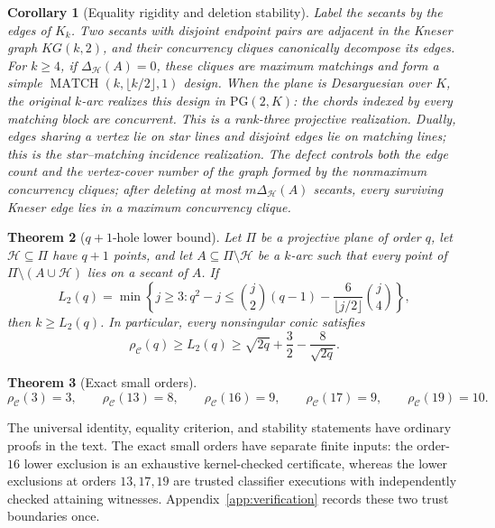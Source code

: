 \documentclass[11pt]{article}
\newtheorem{theorem}{Theorem}[section]
\newtheorem{corollary}[theorem]{Corollary}
\theoremstyle{definition}
\theoremstyle{remark}
\newcommand{\PG}{\mathrm{PG}}
\newcommand{\cC}{\mathcal{C}}
\newcommand{\cH}{\mathcal{H}}
\newcommand{\rhoC}{\rho_{\cC}}
\begin{document}
\begin{corollary}[Equality rigidity and deletion stability]
\label{cor:intro-rigidity}
Label the secants by the edges of \(K_k\).  Two secants with disjoint
endpoint pairs are adjacent in the Kneser graph \(KG(k,2)\), and their
concurrency cliques canonically decompose its edges.  For \(k\ge4\), if
\(\Delta_{\cH}(A)=0\), these cliques are maximum matchings and form a
simple \(\operatorname{MATCH}(k,\lfloor k/2\rfloor,1)\) design.  When
the plane is Desarguesian over \(K\), the original \(k\)-arc realizes this
design in \(\PG(2,K)\): the chords indexed by every matching block are
concurrent.  This is a rank-three projective realization.  Dually, edges
sharing a vertex lie on star lines and disjoint edges lie on matching lines;
this is the star--matching incidence realization.  The defect controls both
the edge count and the vertex-cover number of the graph formed by the
nonmaximum concurrency cliques; after deleting at most
\(m\Delta_{\cH}(A)\) secants, every surviving Kneser edge lies in a maximum
concurrency clique.
\end{corollary}

\begin{theorem}[\(q+1\)-hole lower bound]
\label{thm:main-conic}
Let \(\Pi\) be a projective plane of order \(q\), let
\(\cH\subseteq\Pi\) have \(q+1\) points, and let
\(A\subseteq\Pi\setminus\cH\) be a \(k\)-arc such that every point of
\(\Pi\setminus(A\cup\cH)\) lies on a secant of \(A\).
If
\[
 L_2(q)=\min\left\{j\ge3:
 q^2-j\le\binom{j}{2}(q-1)
 -\frac{6}{\lfloor j/2\rfloor}\binom{j}{4}\right\},
\]
then \(k\ge L_2(q)\).  In particular, every nonsingular conic satisfies
\[
 \rhoC(q)\ge L_2(q)
 \ge \sqrt{2q}+\frac32-\frac8{\sqrt{2q}}.
\]
\end{theorem}

\begin{theorem}[Exact small orders]
\label{thm:intro-small-orders}
\[
 \rhoC(3)=3,\qquad \rhoC(13)=8,\qquad \rhoC(16)=9,\qquad
 \rhoC(17)=9,\qquad \rhoC(19)=10.
\]
\end{theorem}

The universal identity, equality criterion, and stability statements have
ordinary proofs in the text.  The exact small orders have separate finite
inputs: the order-\(16\) lower exclusion is an exhaustive kernel-checked
certificate, whereas the lower exclusions at orders \(13,17,19\) are trusted
classifier executions with independently checked attaining witnesses.
Appendix~\ref{app:verification} records these two trust boundaries once.
\end{document}
